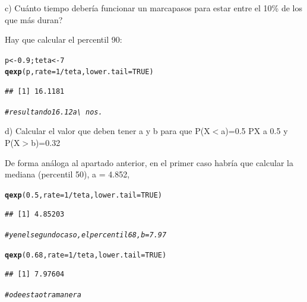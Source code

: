 \documentclass[12pt,letterpaper]{article}\usepackage[]{graphicx}\usepackage[]{color}
\makeatletter
\newcommand{\hlnum}[1]{\textcolor[rgb]{0.686,0.059,0.569}{#1}}%
\newcommand{\hlcom}[1]{\textcolor[rgb]{0.678,0.584,0.686}{\textit{#1}}}%
\newcommand{\hlopt}[1]{\textcolor[rgb]{0,0,0}{#1}}%
\newcommand{\hlstd}[1]{\textcolor[rgb]{0.345,0.345,0.345}{#1}}%
\newcommand{\hlkwb}[1]{\textcolor[rgb]{0.69,0.353,0.396}{#1}}%
\newcommand{\hlkwc}[1]{\textcolor[rgb]{0.333,0.667,0.333}{#1}}%
\newcommand{\hlkwd}[1]{\textcolor[rgb]{0.737,0.353,0.396}{\textbf{#1}}}%
\newenvironment{kframe}{%
 \def\at@end@of@kframe{}%
 \ifinner\ifhmode%
  \def\at@end@of@kframe{\end{minipage}}%
  \begin{minipage}{\columnwidth}%
 \fi\fi%
 \def\FrameCommand##1{\hskip\@totalleftmargin \hskip-\fboxsep
 \colorbox{shadecolor}{##1}\hskip-\fboxsep
     \hskip-\linewidth \hskip-\@totalleftmargin \hskip\columnwidth}%
 \MakeFramed {\advance\hsize-\width
   \@totalleftmargin\z@ \linewidth\hsize
   \@setminipage}}%
 {\par\unskip\endMakeFramed%
 \at@end@of@kframe}
\newenvironment{knitrout}{}{} %
\makeatother
\begin{document}
\begin{description}
\item c) \¿Cu\'anto tiempo deber\'ia funcionar un marcapasos para estar entre el 10\% de los que m\'as duran?

Hay que calcular el percentil 90:
\begin{knitrout}
\color{fgcolor}\begin{kframe}
\begin{alltt}
\hlstd{p} \hlkwb{<-} \hlnum{0.9}\hlstd{; teta} \hlkwb{<-} \hlnum{7}
\hlkwd{qexp}\hlstd{(p,} \hlkwc{rate}\hlstd{=}\hlnum{1}\hlopt{/}\hlstd{teta,} \hlkwc{lower.tail}\hlstd{=}\hlnum{TRUE}\hlstd{)}
\end{alltt}
\begin{verbatim}
## [1] 16.1181
\end{verbatim}
\begin{alltt}
\hlcom{#resultando 16.12 a\textbackslash{}~nos. }
\end{alltt}
\end{kframe}
\end{knitrout}

\item d) Calcular el valor que deben tener a y b para que P(X$<$a)=0.5 PX a 0.5 y P(X$>$b)=0.32

De forma an\'aloga al apartado anterior, en el primer caso habr\'ia que calcular la mediana (percentil 50), a = 4.852,
\begin{knitrout}
\color{fgcolor}\begin{kframe}
\begin{alltt}
\hlkwd{qexp}\hlstd{(}\hlnum{0.5}\hlstd{,} \hlkwc{rate}\hlstd{=}\hlnum{1}\hlopt{/}\hlstd{teta,} \hlkwc{lower.tail}\hlstd{=}\hlnum{TRUE}\hlstd{)}
\end{alltt}
\begin{verbatim}
## [1] 4.85203
\end{verbatim}
\end{kframe}
\end{knitrout}
\begin{knitrout}
\color{fgcolor}\begin{kframe}
\begin{alltt}
\hlcom{# y en el segundo caso, el percentil 68, b = 7.97}

\hlkwd{qexp}\hlstd{(}\hlnum{0.68}\hlstd{,} \hlkwc{rate}\hlstd{=}\hlnum{1}\hlopt{/}\hlstd{teta,} \hlkwc{lower.tail}\hlstd{=}\hlnum{TRUE}\hlstd{)}
\end{alltt}
\begin{verbatim}
## [1] 7.97604
\end{verbatim}
\end{kframe}
\end{knitrout}
\begin{knitrout}
\color{fgcolor}\begin{kframe}
\begin{alltt}
\hlcom{# o de esta otra manera}


\end{alltt}
\end{kframe}
\end{knitrout}
\end{description}
\end{document}
